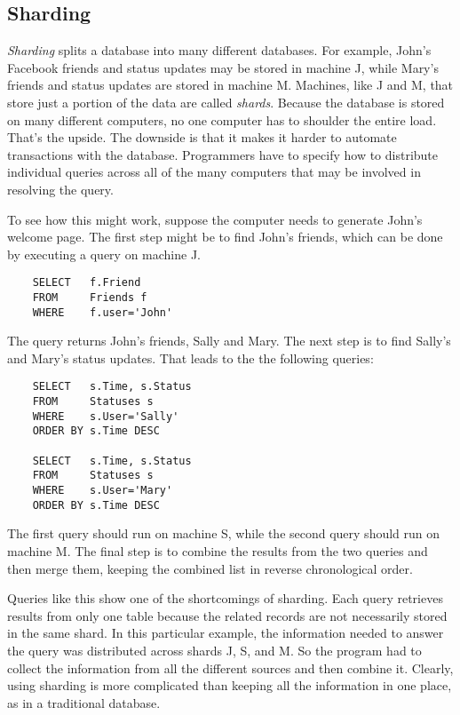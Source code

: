 \subsection{Sharding}

\emph{Sharding} splits a database into many different databases.
For example, John's Facebook friends and status updates may be stored in machine J, while
Mary's friends and status updates are stored in machine M.
Machines, like J and M, that store just a portion of the data are called \emph{shards}.
Because the database is stored on many different computers,
no one computer has to shoulder the entire load.
That's the upside.
The downside is that it makes it harder
to automate transactions with the database.
Programmers have to specify how to distribute
individual queries across all of the many computers
that may be involved in resolving the query.

To see how this might work,
suppose the computer needs to generate John's welcome page.
The first step might be to find John's friends,
which can be done by executing a query on machine J.
\begin{verbatim}
	SELECT   f.Friend
	FROM     Friends f
	WHERE    f.user='John'
\end{verbatim}
The query returns John's friends, Sally and Mary.
The next step is to find Sally's and Mary's status updates.
That leads to the the following queries:
\begin{verbatim}
	SELECT   s.Time, s.Status
	FROM     Statuses s
	WHERE    s.User='Sally'
	ORDER BY s.Time DESC

	SELECT   s.Time, s.Status
	FROM     Statuses s
	WHERE    s.User='Mary'
	ORDER BY s.Time DESC
\end{verbatim}
The first query should run on machine S,
while the second query should run on machine M.
The final step is to combine the results from the two queries
and then merge them, keeping
the combined list in reverse chronological order.

Queries like this show one of the shortcomings of sharding.
Each query retrieves results from only one table
because the related records
are not necessarily stored in the same shard.
In this particular example, the information needed to answer the query was
distributed across shards J, S, and M.
So the program had to collect the information
from all the different sources and then combine it.
Clearly, using sharding is more complicated
than keeping all the information in one place,
as in a traditional database.

